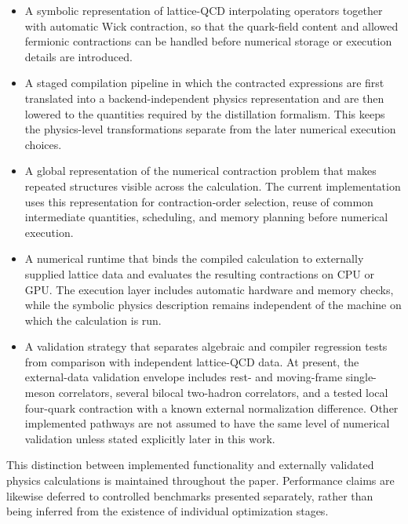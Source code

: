 \documentclass[11pt]{article}
\begin{document}
\begin{itemize}

\item A symbolic representation of lattice-QCD interpolating operators together
with automatic Wick contraction, so that the quark-field content and allowed
fermionic contractions can be handled before numerical storage or execution
details are introduced.

\item A staged compilation pipeline in which the contracted expressions are
first translated into a backend-independent physics representation and are then
lowered to the quantities required by the distillation formalism. This keeps
the physics-level transformations separate from the later numerical execution
choices.

\item A global representation of the numerical contraction problem that makes
repeated structures visible across the calculation. The current implementation
uses this representation for contraction-order selection, reuse of common
intermediate quantities, scheduling, and memory planning before numerical
execution.

\item A numerical runtime that binds the compiled calculation to externally
supplied lattice data and evaluates the resulting contractions on CPU or GPU.
The execution layer includes automatic hardware and memory checks, while the
symbolic physics description remains independent of the machine on which the
calculation is run.

\item A validation strategy that separates algebraic and compiler regression
tests from comparison with independent lattice-QCD data. At present, the
external-data validation envelope includes rest- and moving-frame single-meson
correlators, several bilocal two-hadron correlators, and a tested local
four-quark contraction with a known external normalization difference. Other
implemented pathways are not assumed to have the same level of numerical
validation unless stated explicitly later in this work.

\end{itemize}

This distinction between implemented functionality and externally validated
physics calculations is maintained throughout the paper. Performance claims
are likewise deferred to controlled benchmarks presented separately, rather
than being inferred from the existence of individual optimization stages.
\end{document}
